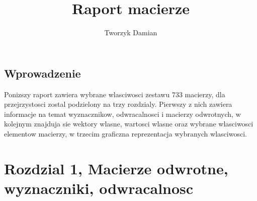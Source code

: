 \documentclass[a4paper,12pt]{article}
\title{Raport macierze}\author{Tworzyk Damian}
\begin{document}
 
\maketitle  \tableofcontents \newpage
\begin{center}\vspace*{5pt}
\begingroup \section{Wprowadzenie}
Ponizszy raport zawiera wybrane wlasciwosci zestawu 733 macierzy, dla przejrzystosci zostal podzielony na trzy rozdzialy. Pierwszy z nich zawiera informacje na temat wyznacznikow, odwracalnosci i macierzy odwrotnych, w kolejnym znajduja sie wektory wlasne, wartosci wlasne oraz wybrane wlasciwosci elementow macierzy, w trzecim graficzna reprezentacja wybranych wlasciwosci. 
\end{center}\endgroup\vspace*{5pt}
\newpage
\vspace*{\fill}\begingroup\section{Rozdzial 1, Macierze odwrotne, wyznaczniki, odwracalnosc}\endgroup
      \vspace*{\fill}\newpage
\end{document}
